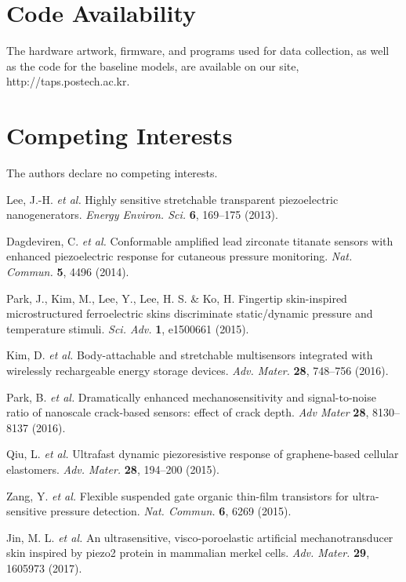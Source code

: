 \documentclass[10pt]{wlscirep}
\begin{document}
\section*{Code Availability}
The hardware artwork, firmware, and programs used for data collection, as well as the code for the baseline models, are available on our site, http://taps.postech.ac.kr.

\section*{Competing Interests}
The authors declare no competing interests.

%
\begin{thebibliography}{99}

Lee, J.-H. \textit{et al.} Highly sensitive stretchable transparent piezoelectric nanogenerators. 
\textit{Energy Environ. Sci.} \textbf{6}, 169–175 (2013).

Dagdeviren, C. \textit{et al.} Conformable amplified lead zirconate titanate sensors with enhanced piezoelectric response for cutaneous pressure monitoring.
\textit{Nat. Commun.} \textbf{5}, 4496 (2014).

Park, J., Kim, M., Lee, Y., Lee, H. S. \& Ko, H. Fingertip skin-inspired microstructured ferroelectric skins discriminate static/dynamic pressure and temperature stimuli.
\textit{Sci. Adv.} \textbf{1}, e1500661 (2015).

Kim, D. \textit{et al.} Body-attachable and stretchable multisensors integrated with wirelessly rechargeable energy storage devices.
\textit{Adv. Mater.} \textbf{28}, 748–756 (2016).

Park, B. \textit{et al.} Dramatically enhanced mechanosensitivity and signal-to-noise ratio of nanoscale crack-based sensors: effect of crack depth.
\textit{Adv Mater} \textbf{28}, 8130–8137 (2016).

Qiu, L. \textit{et al.} Ultrafast dynamic piezoresistive response of graphene-based cellular elastomers.
\textit{Adv. Mater.} \textbf{28}, 194–200 (2015).

Zang, Y. \textit{et al.} Flexible suspended gate organic thin-film transistors for ultra-sensitive pressure detection.
\textit{Nat. Commun.} \textbf{6}, 6269 (2015).

Jin, M. L. \textit{et al.} An ultrasensitive, visco-poroelastic artificial mechanotransducer skin inspired by piezo2 protein in mammalian merkel cells.
\textit{Adv. Mater.} \textbf{29}, 1605973 (2017).


\end{thebibliography}
\end{document}
